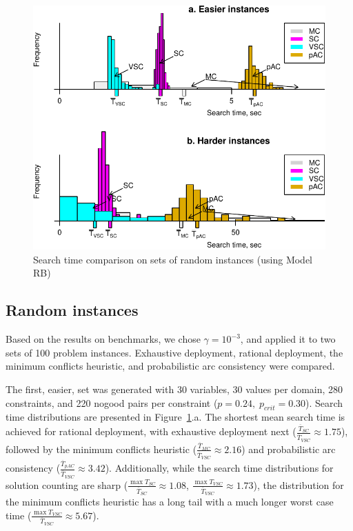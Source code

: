 \begin{figure}[h] 
\centering
\includegraphics[scale=0.75]{csp-random-problems-arrows+legend.pdf}
\caption{Search time comparison on sets of random instances (using
  Model RB)}
\label{fig:random-problems}
\end{figure}

\subsection{Random instances}
\label{sec:csp-random-instances}

Based on the results on benchmarks, we chose $\gamma=10^{-3}$, and
applied it to two sets of 100 problem instances. 
Exhaustive deployment, rational deployment, the
minimum conflicts heuristic, and probabilistic arc consistency
were compared.

The first, easier, set was generated with 30 variables, 30 values per
domain, 280 constraints, and 220 nogood pairs per constraint
($p=0.24,\;p_{crit}=0.30$). Search time distributions are presented in
Figure~\ref{fig:random-problems}.a. The shortest mean search time is
achieved for rational deployment, with exhaustive deployment
next ($\frac {\overline T_{SC}} {\overline T_{VSC}}
\approx 1.75 $), followed by the minimum conflicts heuristic ($\frac
{\overline T_{MC}} {\overline T_{VSC}} \approx 2.16$) and 
probabilistic arc consistency ($\frac {\overline T_{pAC}} {\overline
  T_{VSC}} \approx 3.42$). Additionally,
while the search time distributions for solution counting are sharp
($\frac {\max T_{SC}} {\overline T_{SC}} \approx 1.08$, $\frac {\max
T_{VSC}} {\overline T_{VSC}} \approx 1.73$), the distribution for the
minimum conflicts heuristic has a long tail with a much longer worst
case time ($\frac {\max T_{VSC}} {\overline T_{VSC}} \approx 5.67$).

